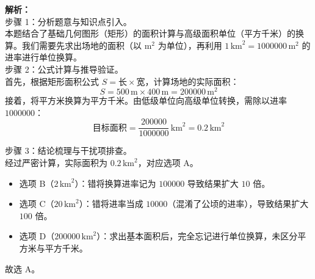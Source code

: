 \documentclass[12pt,a4paper]{exam-zh}
\begin{document}
\begin{solution}
    \textbf{解析：} \\
    步骤 1：分析题意与知识点引入。 \\
    本题结合了基础几何图形（矩形）的面积计算与高级面积单位（平方千米）的换算。我们需要先求出场地的面积（以 $\mathrm{m}^2$ 为单位），再利用 $1 \, \mathrm{km}^2 = 1000000 \, \mathrm{m}^2$ 的进率进行单位换算。 \\
    
    步骤 2：公式计算与推导验证。 \\
    首先，根据矩形面积公式 $S = \text{长} \times \text{宽}$，计算场地的实际面积：
    \[ \displaystyle S = 500 \, \mathrm{m} \times 400 \, \mathrm{m} = 200000 \, \mathrm{m}^2 \]
    接着，将平方米换算为平方千米。由低级单位向高级单位转换，需除以进率 $1000000$：
    \[ \displaystyle \text{目标面积} = \frac{200000}{1000000} \, \mathrm{km}^2 = 0.2 \, \mathrm{km}^2 \]
    
    步骤 3：结论梳理与干扰项排查。 \\
    经过严密计算，实际面积为 $0.2 \, \mathrm{km}^2$，对应选项 A。 
    \begin{itemize}
        \item 选项 B（$2 \, \mathrm{km}^2$）：错将换算进率记为 $100000$ 导致结果扩大 $10$ 倍。
        \item 选项 C（$20 \, \mathrm{km}^2$）：错将进率当成 $10000$（混淆了公顷的进率），导致结果扩大 $100$ 倍。
        \item 选项 D（$200000 \, \mathrm{km}^2$）：求出基本面积后，完全忘记进行单位换算，未区分平方米与平方千米。
    \end{itemize} 
    
    故选 A。
\end{solution}

\newpage
\end{document}
